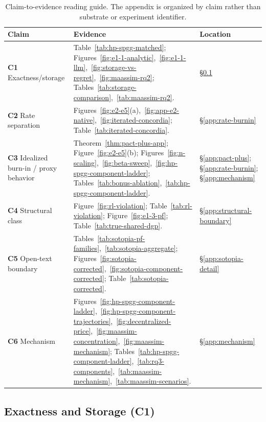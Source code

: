 \begin{table}[h!]
\centering\scriptsize
\caption{Claim-to-evidence reading guide. The appendix is organized by claim rather than substrate or experiment identifier.}
\label{tab:appendix-inventory}
\setlength{\tabcolsep}{1pt}
\begin{tabular}{@{}p{}>{\raggedright\arraybackslash}p{}p{}@{}}
\toprule
Claim & Evidence & Location \\
\midrule
\textbf{C1} Exactness/storage & Table~\ref{tab:hp-spgg-matched}; Figures~\ref{fig:e1-1-analytic},~\ref{fig:e1-1-llm},~\ref{fig:storage-vs-regret},~\ref{fig:maassim-rq2}; Tables~\ref{tab:storage-comparison},~\ref{tab:maassim-rq2}. & \S\ref{app:hp-spgg-diagnostics} \\[2pt]
\textbf{C2} Rate separation & Figures~\ref{fig:e2-e5}(a),~\ref{fig:app-e2-native},~\ref{fig:iterated-concordia}; Table~\ref{tab:iterated-concordia}. & \S\ref{app:rate-burnin} \\[2pt]
\textbf{C3} Idealized burn-in / proxy behavior & Theorem~\ref{thm:pact-plus-app}; Figure~\ref{fig:e2-e5}(b); Figures~\ref{fig:n-scaling},~\ref{fig:beta-sweep},~\ref{fig:hp-spgg-component-ladder}; Tables~\ref{tab:bonus-ablation},~\ref{tab:hp-spgg-component-ladder}. & \S\ref{app:pact-plus}; \S\ref{app:rate-burnin}; \S\ref{app:mechanism} \\[2pt]
\textbf{C4} Structural class & Figure~\ref{fig:rl-violation}; Table~\ref{tab:rl-violation}; Figure~\ref{fig:e1-3-pf}; Table~\ref{tab:true-shared-dgp}. & \S\ref{app:structural-boundary} \\[2pt]
\textbf{C5} Open-text boundary & Tables~\ref{tab:sotopia-pf-families},~\ref{tab:sotopia-aggregate}; Figures~\ref{fig:sotopia-corrected},~\ref{fig:sotopia-component-corrected}; Table~\ref{tab:sotopia-corrected}. & \S\ref{app:sotopia-detail} \\[2pt]
\textbf{C6} Mechanism & Figures~\ref{fig:hp-spgg-component-ladder},~\ref{fig:hp-spgg-component-trajectories},~\ref{fig:decentralized-price},~\ref{fig:maassim-concentration},~\ref{fig:maassim-mechanism}; Tables~\ref{tab:hp-spgg-component-ladder},~\ref{tab:rq3-components},~\ref{tab:maassim-mechanism},~\ref{tab:maassim-scenarios}. & \S\ref{app:mechanism} \\
\bottomrule
\end{tabular}
\end{table}

\subsection{Exactness and Storage (C1)}
\label{app:hp-spgg-diagnostics}
\label{app:llm-supplements}

